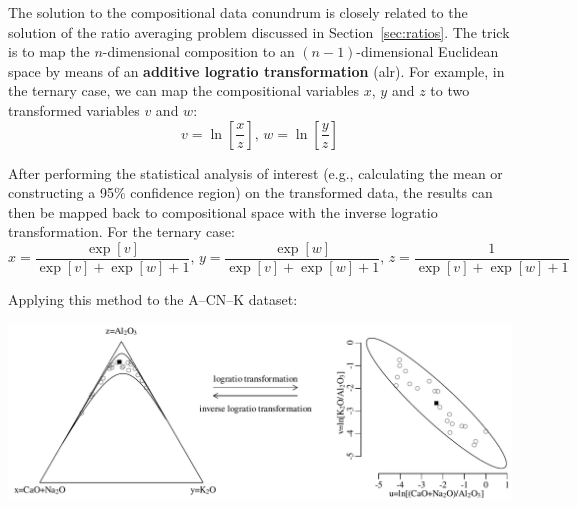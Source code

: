 The solution to the compositional data conundrum is closely related to
the solution of the ratio averaging problem discussed in
Section~\ref{sec:ratios}. The trick is to map the $n$-dimensional
composition to an $(n-1)$-dimensional Euclidean space by means of an
\textbf{additive logratio transformation} (alr). For example, in the
ternary case, we can map the compositional variables $x$, $y$ and $z$
to two transformed variables $v$ and $w$:
\begin{equation}
  v = \ln\!\left[\frac{x}{z}\right] \mbox{,~} w =
  \ln\!\left[\frac{y}{z}\right]
  \label{eq:alr}
\end{equation}

After performing the statistical analysis of interest (e.g.,
calculating the mean or constructing a 95\% confidence region) on the
transformed data, the results can then be mapped back to compositional
space with the inverse logratio transformation. For the ternary case:
\begin{equation}
  x = \frac{\exp[v]}{\exp[v] + \exp[w] + 1} \mbox{,~}
  y = \frac{\exp[w]}{\exp[v] + \exp[w] + 1} \mbox{,~}
  z = \frac{1}{\exp[v] + \exp[w] + 1}
  \label{eq:inverse-logratio-transformation}
\end{equation}

Applying this method to the A--CN--K dataset:\medskip

\noindent\includegraphics[width=\linewidth]{../figures/alr.PDF}
\begingroup {}
\label{fig:alr}\endgroup

